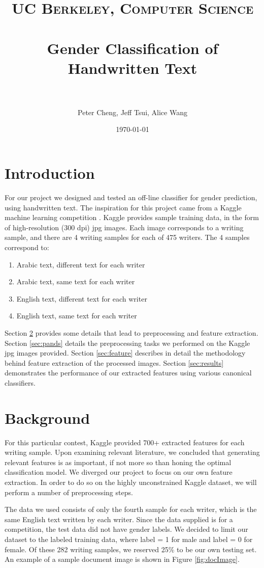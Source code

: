 \documentclass[paper=a4, fontsize=11pt]{scrartcl} %
\title{	
\normalfont \normalsize 
\textsc{UC Berkeley, Computer Science} \\ [25pt] %
\horrule{0.5pt} \\[0.4cm] %
\huge Gender Classification of Handwritten Text \\ %
\horrule{2pt} \\[0.5cm] %
}
\author{Peter Cheng, Jeff Tsui, Alice Wang} %
\date{\normalsize\today} %
\numberwithin{equation}{section} %
\numberwithin{figure}{section} %
\numberwithin{table}{section} %
\begin{document}
\maketitle %

\section{Introduction}
For our project we designed and tested an off-line classifier for
gender prediction, using handwritten text. The inspiration for this
project came from a Kaggle machine learning competition
\cite{kaggle}. Kaggle provides sample training data, in the form of
high-resolution (300 dpi) jpg images. Each image corresponds to a
writing sample, and there are 4 writing samples for each of 475
writers. The 4 samples correspond to:

\begin{enumerate}
\item Arabic text, different text for each writer
\item Arabic text, same text for each writer
\item English text, different text for each writer
\item English text, same text for each writer
\end{enumerate}

Section \ref{sec:background} provides some details that lead to
preprocessing and feature extraction. Section \ref{sec:pands} details
the preprocessing tasks we performed on the Kaggle jpg images
provided. Section \ref{sec:feature} describes in detail the
methodology behind feature extraction of the processed images. Section
\ref{sec:results} demonstrates the performance of our extracted features
using various canonical classifiers.

\section{Background}
\label{sec:background}
For this particular contest, Kaggle provided 700+ extracted features
for each writing sample. Upon examining relevant literature, we
concluded that generating relevant features is as important, if not
more so than honing the optimal classification model. We diverged our
project to focus on our own feature extraction. In order to do so on
the highly unconstrained Kaggle dataset, we will perform a number of
preprocessing steps.

The data we used consists of only the fourth sample for each writer,
which is the same English text written by each writer. Since the data
supplied is for a competition, the test data did not have gender
labels. We decided to limit our dataset to the labeled training data,
where label = 1 for male and label = 0 for female. Of these 282
writing samples, we reserved
25\% to be our own testing set. An example of a sample document image is shown in Figure \ref{fig:docImage}.
\end{document}
